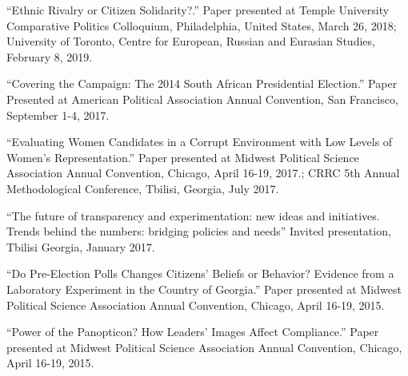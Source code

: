 \documentclass[margin,line]{res}
\begin{document}
{\begin{resume}
``Ethnic Rivalry or Citizen Solidarity?.'' Paper presented at Temple
University Comparative Politics Colloquium, Philadelphia, United
States, March 26, 2018;  University of
Toronto, Centre for European, Russian and Eurasian Studies, February
8, 2019. 

``Covering the Campaign: The 2014 South African Presidential Election.'' Paper Presented at
American Political Association Annual Convention, San Francisco, September
1-4, 2017. 

``Evaluating Women Candidates in a Corrupt Environment with Low Levels of Women’s Representation.''
Paper presented at Midwest Political Science Association Annual
Convention, Chicago, April 16-19, 2017.; CRRC 5th Annual Methodological Conference, Tbilisi, Georgia, July 2017.

``The future of transparency and experimentation: new ideas and
initiatives. Trends behind the numbers: bridging policies and needs''
Invited presentation, Tbilisi Georgia, January 2017. 

``Do Pre-Election Polls Changes Citizens' Beliefs or Behavior?
Evidence from a Laboratory Experiment in the Country of Georgia.''
Paper presented at Midwest Political Science Association Annual
Convention, Chicago, April 16-19, 2015.

``Power of the Panopticon? How Leaders' Images Affect Compliance.''
Paper presented at Midwest Political Science Association Annual
Convention, Chicago, April 16-19, 2015.

%




\end{resume}}
\end{document}
